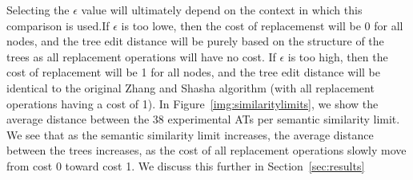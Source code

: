 Selecting the $\epsilon$ value will ultimately depend on the context in which this comparison is used.If $\epsilon$ is too lowe, then the cost of replacemenst will be 0 for all nodes, and the tree edit distance will be purely based on the structure of the trees as all replacement operations will have no cost. If $\epsilon$ is too high, then the cost of replacement will be 1 for all nodes, and the tree edit distance will be identical to the original Zhang and Shasha algorithm (with all replacement operations having a cost of 1). In Figure~\ref{img:similaritylimits}, we show the average distance between the 38 experimental ATs per semantic similarity limit. We see that as the semantic similarity limit increases, the average distance between the trees increases, as the cost of all replacement operations slowly move from cost 0 toward cost 1. We discuss this further in Section~\ref{sec:results}